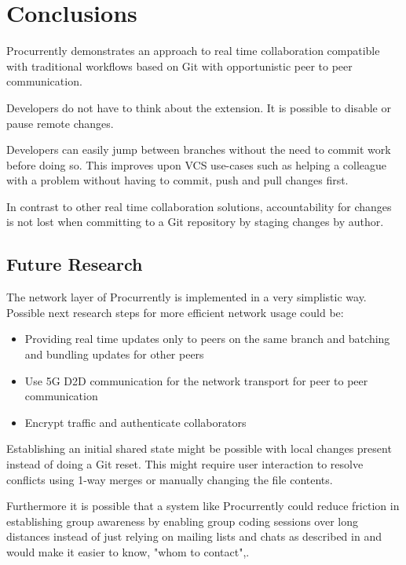 \chapter{Conclusions}

Procurrently demonstrates an approach to real time collaboration compatible with traditional workflows based on Git with opportunistic peer to peer communication. 

Developers do not have to think about the extension. It is possible to disable or pause remote changes. 

Developers can easily jump between branches without the need to commit work before doing so. This improves upon VCS use-cases such as helping a colleague with a problem without having to commit, push and pull changes first. 

In contrast to other real time collaboration solutions, accountability for changes is not lost when committing to a Git repository by staging changes by author.

\section{Future Research}

The network layer of Procurrently is implemented in a very simplistic way.
Possible next research steps for more efficient network usage could be:

\begin{itemize}
    \item Providing real time updates only to peers on the same branch and batching and bundling updates for other peers
    \item Use 5G D2D communication for the network transport for peer to peer communication \cite{TehraniUysalYanikomeroglu:2014:Device-to-devicecommunicationin5G}
    \item Encrypt traffic and authenticate collaborators
\end{itemize}

Establishing an initial shared state might be possible with local changes present instead of doing a Git reset. This might require user interaction to resolve conflicts using 1-way merges or manually changing the file contents.\cite{7070484}

Furthermore it is possible that a system like Procurrently could reduce friction in establishing group awareness by enabling group coding sessions over long distances instead of just relying on mailing lists and chats as described in \cite{Gutwin:2004:GAD:1031607.1031621} and would make it easier to know, "whom to contact"\cite{795103},\cite{Gutwin:2004:GAD:1031607.1031621}.

